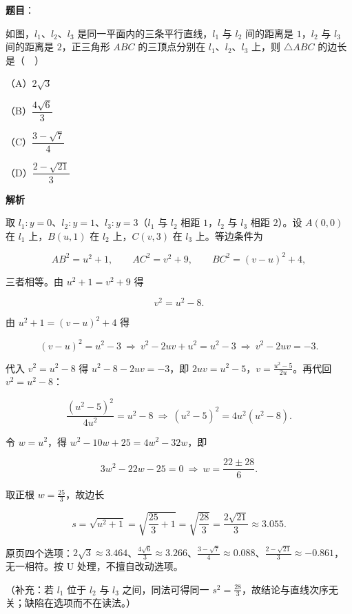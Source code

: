 \begin{answer}

\textbf{题目}：

如图，$l_1$、$l_2$、$l_3$ 是同一平面内的三条平行直线，$l_1$ 与 $l_2$ 间的距离是 $1$，$l_2$ 与 $l_3$ 间的距离是 $2$，正三角形 $ABC$ 的三顶点分别在 $l_1$、$l_2$、$l_3$ 上，则 $\triangle ABC$ 的边长是（　）
\nopagebreak[4]
\begin{center}\end{center}
\nopagebreak[4]
（A）$2\sqrt3$

（B）$\dfrac{4\sqrt6}{3}$

（C）$\dfrac{3-\sqrt7}{4}$

（D）$\dfrac{2-\sqrt{21}}{3}$

\textbf{解析}

取 $l_1:y=0$、$l_2:y=1$、$l_3:y=3$（$l_1$ 与 $l_2$ 相距 $1$，$l_2$ 与 $l_3$ 相距 $2$）。设 $A(0,0)$ 在 $l_1$ 上，$B(u,1)$ 在 $l_2$ 上，$C(v,3)$ 在 $l_3$ 上。等边条件为

\nopagebreak[4]
\[AB^2=u^2+1,\qquad AC^2=v^2+9,\qquad BC^2=(v-u)^2+4,\]

三者相等。由 $u^2+1=v^2+9$ 得

\nopagebreak[4]
\[v^2=u^2-8 .\]

由 $u^2+1=(v-u)^2+4$ 得

\nopagebreak[4]
\[(v-u)^2=u^2-3\ \Longrightarrow\ v^2-2uv+u^2=u^2-3\ \Longrightarrow\ v^2-2uv=-3 .\]

代入 $v^2=u^2-8$ 得 $u^2-8-2uv=-3$，即 $2uv=u^2-5$，$v=\frac{u^2-5}{2u}$。再代回 $v^2=u^2-8$：

\nopagebreak[4]
\[\frac{(u^2-5)^2}{4u^2}=u^2-8\ \Longrightarrow\ (u^2-5)^2=4u^2(u^2-8).\]

令 $w=u^2$，得 $w^2-10w+25=4w^2-32w$，即

\nopagebreak[4]
\[3w^2-22w-25=0\ \Longrightarrow\ w=\frac{22\pm28}{6}.\]

取正根 $w=\frac{25}{3}$，故边长

\nopagebreak[4]
\[s=\sqrt{u^2+1}=\sqrt{\frac{25}{3}+1}=\sqrt{\frac{28}{3}}=\frac{2\sqrt{21}}{3}\approx3.055 .\]

原页四个选项：$2\sqrt3\approx3.464$、$\frac{4\sqrt6}{3}\approx3.266$、$\frac{3-\sqrt7}{4}\approx0.088$、$\frac{2-\sqrt{21}}{3}\approx-0.861$，无一相符。按 U 处理，不擅自改动选项。

（补充：若 $l_1$ 位于 $l_2$ 与 $l_3$ 之间，同法可得同一 $s^2=\frac{28}{3}$，故结论与直线次序无关；缺陷在选项而不在读法。）


\end{answer}

